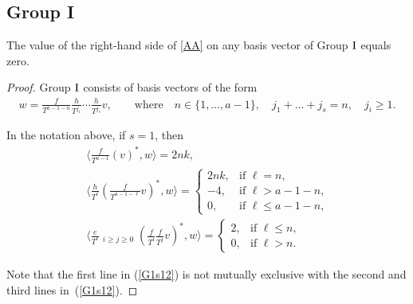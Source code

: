 \subsection{Group I}
\begin{prop}\label{Pr3}The value of the right-hand side of \eqref{AA} on any basis vector of Group ${\rm I}$ equals zero.
\end{prop}
\begin{proof}Group ${\rm I}$ consists of basis vectors of the form
\begin{gather*}
w = \frac{f}{T^{a-1-n}}\frac{h}{T^{j_1}} \cdots \frac{h}{T^{j_s}} v, \qquad \text{where} \quad
n \in \{1, \dots, a-1 \},\quad j_1 + \dots + j_s = n, \quad j_i \geq 1.
\end{gather*}

\begin{lem}\label{Group 3, s=1} In the notation above, if $s =1$, then
\begin{gather}
\bigg\langle \frac{f}{T^{a-1}} (v)^*, w \bigg\rangle = 2 n k, \nonumber\\ %
\bigg\langle \frac{h}{T^{\ell}} \left(\frac{f}{T^{a-1-\ell}}v\right)^*, w \bigg\rangle = \begin{cases}
 2 n k, & \text{if $\ell=n$,}\\
 - 4, & \text{if $\ell > a-1-n$,} \\
 0, & \text{if $\ell \leq a-1-n$,}
 \end{cases} \label{G1s12}
\\
\bigg\langle \frac{e}{T^{\ell}} \mathop{\sum_{i+j=a-1-\ell}}_{i\geq j\geq 0} \left(\frac{f}{T^i}\frac{f}{T^j}v\right)^*, w \bigg\rangle =
 \begin{cases}
 2, & \text{if $\ell \leq n$,}\\
 0, & \text{if $\ell > n$. }
 \end{cases} \nonumber %
\end{gather}
\end{lem}

Note that the first line in (\ref{G1s12}) is not mutually exclusive with the second and third lines in~(\ref{G1s12}).


\end{proof}
